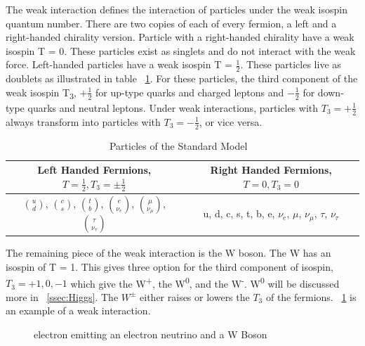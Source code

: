 \indent The weak interaction defines the interaction of particles under the weak isospin quantum number. There are two copies of each of every fermion, a left and a right-handed chirality version. Particle with a right-handed chirality have a weak isospin T = 0. These particles exist as singlets and do not interact with the weak force. Left-handed particles have a weak isospin T =  ${\frac{1}{2}}$. These particles live as doublets as illustrated in table ~\ref{tab:chiral}. For these particles, the third component of the weak isospin T\textsubscript{3}, ${+\frac{1}{2}}$ for up-type quarks and charged leptons and ${-\frac{1}{2}}$ for down-type quarks and neutral leptons. Under weak interactions, particles with ${T_{3} = +\frac{1}{2}}$ always transform into particles with ${T_{3} = -\frac{1}{2}}$, or vice versa.\linebreak

\begin{table}[h]
\begin{center}
\def\arraystretch{1.5}
\begin{tabular}[h]{|c|c|}
\hline
Left Handed Fermions, ${T = \frac{1}{2}, T_{3} = \pm\frac{1}{2}}$ & Right Handed Fermions, ${T = 0, T_{3} = 0}$\\
\hline\hline
${\binom{u}{d}}$, ${\binom{c}{s}}$, ${\binom{t}{b}}$, ${\binom{e}{\nu_{e}}}$, ${\binom{\mu}{\nu_{\mu}}}$, ${\binom{\tau}{\nu_{\tau}}}$ & u, d, c, s, t, b, e, ${\nu_{e}}$, ${\mu}$, ${\nu_{\mu}}$, ${\tau}$, ${\nu_{\tau}}$ \\
\hline
\end{tabular}
\caption{Particles of the Standard Model ~\cite{Ian:2018}}
\label{tab:chiral}
\end{center}
\end{table}


 \indent The remaining piece of the weak interaction is the W boson. The W has an isospin of T = 1. This gives three option for the third component of isospin, ${T_{3} = +1, 0, -1}$ which give the W\textsuperscript{+}, the W\textsuperscript{0}, and the W\textsuperscript{-}. W\textsuperscript{0} will be discussed more in ~\ref{ssec:Higgs}. The ${W^{\pm}}$ either raises or lowers the ${T_{3}}$ of the fermions. ~\ref{Fig:weak_dia} is an example of a weak interaction.\linebreak

\begin{figure}[h]
\begin{center}

\caption{electron emitting an electron neutrino and a W Boson}
\label{Fig:weak_dia}
\end{center}
\end{figure}

